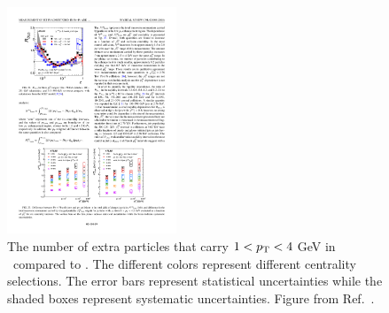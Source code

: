 

\begin{figure}[htbp]
\begin{center}
\includegraphics[width=0.45\textwidth]{figures/jetMeasurements/jetff_nch}
\caption{The number of extra particles that carry $1<\mbox{$p_{\mathrm{T}}$}<4$ GeV  in \pbpb\ compared to \pp.
The different colors represent different centrality selections.
The error bars represent statistical uncertainties while the shaded boxes represent systematic uncertainties.
Figure from Ref.~\cite{PhysRevC.98.024908}.}
\label{fig:jetff_nch}
\end{center}
\end{figure}

